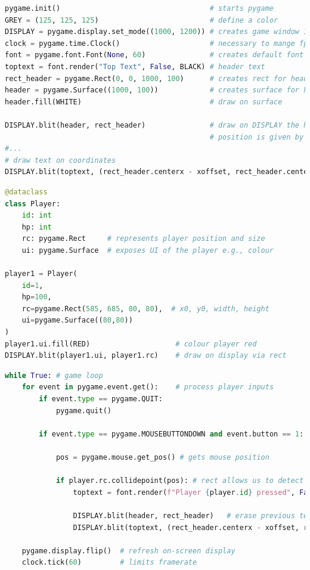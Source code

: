 \begin{lstlisting}[language={Python},label={code:pygameIntro}, caption={Pygame base components}]
pygame.init()                                   # starts pygame
GREY = (125, 125, 125)                          # define a color
DISPLAY = pygame.display.set_mode((1000, 1200)) # creates game window 1000x1200 pixels in resolution
clock = pygame.time.Clock()                     # necessary to mange fps
font = pygame.font.Font(None, 60)               # creates default font 
toptext = font.render("Top Text", False, BLACK) # header text
rect_header = pygame.Rect(0, 0, 1000, 100)      # creates rect for header
header = pygame.Surface((1000, 100))            # creates surface for header
header.fill(WHITE)                              # draw on surface 

DISPLAY.blit(header, rect_header)               # draw on DISPLAY the header surface
                                                # position is given by rect_header                                    
#...
# draw text on coordinates
DISPLAY.blit(toptext, (rect_header.centerx - xoffset, rect_header.centery - yoffset))
\end{lstlisting}

\begin{lstlisting}[language={Python},label={code:pygamePlayer}, caption={Players defined as dataclasses that encapsulate Pygame elements}]
@dataclass
class Player:
    id: int
    hp: int
    rc: pygame.Rect     # represents player position and size 
    ui: pygame.Surface  # exposes UI of the player e.g., colour 

player1 = Player(
    id=1,
    hp=100,
    rc=pygame.Rect(585, 685, 80, 80),  # x0, y0, width, height
    ui=pygame.Surface((80,80))
)
player1.ui.fill(RED)                    # colour player red
DISPLAY.blit(player1.ui, player1.rc)    # draw on display via rect
\end{lstlisting}

\begin{lstlisting}[language={Python},label={code:pygameLoop}, caption={All interactions and frame-by-frame rendering happen in the game loop}]
while True: # game loop
    for event in pygame.event.get():    # process player inputs
        if event.type == pygame.QUIT:
            pygame.quit()

        if event.type == pygame.MOUSEBUTTONDOWN and event.button == 1:  # left mouse button click

            pos = pygame.mouse.get_pos() # gets mouse position

            if player.rc.collidepoint(pos): # rect allows us to detect collisions
                toptext = font.render(f"Player {player.id} pressed", False, BLACK)

                DISPLAY.blit(header, rect_header)   # erase previous text
                DISPLAY.blit(toptext, (rect_header.centerx - xoffset, rect_header.centery - yoffset))

    pygame.display.flip()  # refresh on-screen display
    clock.tick(60)         # limits framerate
\end{lstlisting}

